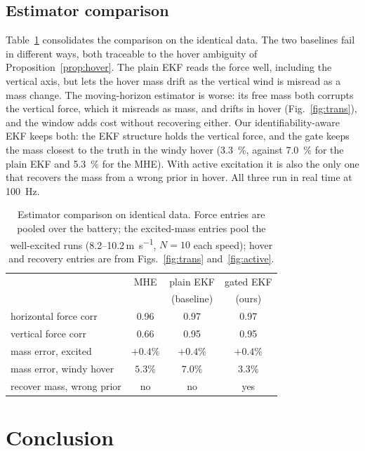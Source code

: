 \documentclass{ieeeaccess}
\begin{document}
\subsection{Estimator comparison}
Table~\ref{tab:compare} consolidates the comparison on the identical data. The
two baselines fail in different ways, both traceable to the hover ambiguity of
Proposition~\ref{prop:hover}. The plain EKF reads the force well, including the
vertical axis, but lets the hover mass drift as the vertical wind is misread as a
mass change. The moving-horizon estimator is worse: its free mass both corrupts
the vertical force, which it misreads as mass, and drifts in hover (Fig.~\ref{fig:trans}),
and the window adds cost without recovering either. Our identifiability-aware EKF
keeps both: the EKF structure holds the vertical force, and the gate keeps the mass
closest to the truth in the windy hover (\SI{3.3}{\percent}, against
\SI{7.0}{\percent} for the plain EKF and \SI{5.3}{\percent} for the MHE). With
active excitation it is also the only one that recovers the mass from a wrong prior
in hover. All three run in real time at \SI{100}{\hertz}.

\begin{table}[t]
\centering
\caption{Estimator comparison on identical data. Force entries are pooled over
the battery; the excited-mass entries pool the well-excited runs
(8.2--10.2\,\si{\meter\per\second}, $N{=}10$ each speed); hover and recovery
entries are from Figs.~\ref{fig:trans} and~\ref{fig:active}.}
\label{tab:compare}
\begin{tabular}{lccc}
\toprule
 & MHE & plain EKF & gated EKF \\
 &     & (baseline) & (ours) \\
\midrule
horizontal force corr      & 0.96 & 0.97 & 0.97 \\
vertical force corr        & 0.66 & 0.95 & 0.95 \\
mass error, excited        & $+0.4\%$ & $+0.4\%$ & $+0.4\%$ \\
mass error, windy hover    & $5.3\%$ & $7.0\%$ & $\mathbf{3.3\%}$ \\
recover mass, wrong prior  & no & no & yes \\
\bottomrule
\end{tabular}
\end{table}

\section{Conclusion}\label{sec:conclusion}
\end{document}
